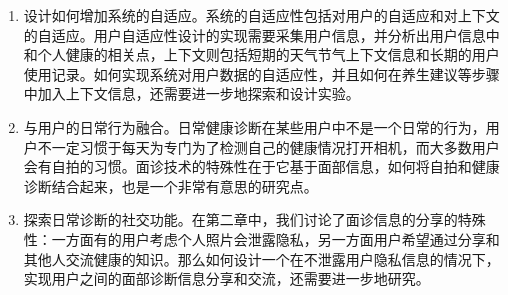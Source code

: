 \begin{enumerate}
	\item 设计如何增加系统的自适应。系统的自适应性包括对用户的自适应和对上下文的自适应。用户自适应性设计的实现需要采集用户信息，并分析出用户信息中和个人健康的相关点，上下文则包括短期的天气节气上下文信息和长期的用户使用记录。如何实现系统对用户数据的自适应性，并且如何在养生建议等步骤中加入上下文信息，还需要进一步地探索和设计实验。

	\item 与用户的日常行为融合。日常健康诊断在某些用户中不是一个日常的行为，用户不一定习惯于每天为专门为了检测自己的健康情况打开相机，而大多数用户会有自拍的习惯。面诊技术的特殊性在于它基于面部信息，如何将自拍和健康诊断结合起来，也是一个非常有意思的研究点。

	\item 探索日常诊断的社交功能。在第二章中，我们讨论了面诊信息的分享的特殊性：一方面有的用户考虑个人照片会泄露隐私，另一方面用户希望通过分享和其他人交流健康的知识。那么如何设计一个在不泄露用户隐私信息的情况下，实现用户之间的面部诊断信息分享和交流，还需要进一步地研究。
\end{enumerate}


